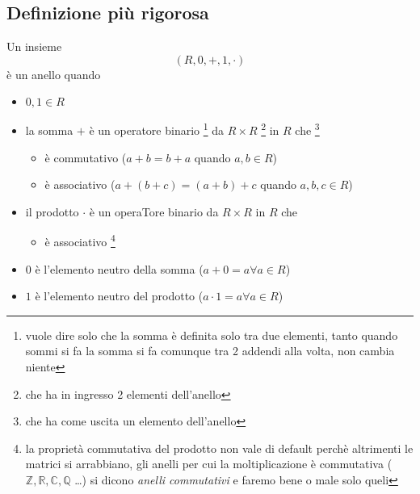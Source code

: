 \documentclass[11pt]{article}
\begin{document}
\subsection{Definizione più rigorosa}
\label{sec:org120c1fa}
Un insieme
\[(R,0,+,1,\cdot)\]
è un anello quando
\begin{itemize}
\item \(0,1 \in R\)
\item la somma \(+\) è un operatore binario
\footnote{vuole dire solo che la somma è definita solo tra due elementi,
tanto quando sommi si fa la somma si fa comunque tra 2 addendi alla
volta, non cambia niente} 
da \(R \times R\)
\footnote{che ha in ingresso 2 elementi dell'anello}
in \(R\) che
\footnote{che ha come uscita un elemento dell'anello}
\begin{itemize}
\item è commutativo (\(a+b = b+a\) quando \(a,b \in R\))
\item è associativo (\(a+(b+c) = (a+b)+c\) quando \(a,b,c \in R\))
\end{itemize}
\item il prodotto \(\cdot\) è un operaTore binario da \(R\times R\) in \(R\) che
\begin{itemize}
\item è associativo \footnote{la proprietà commutativa del prodotto non vale
di default perchè altrimenti le matrici si arrabbiano, gli anelli
per cui la moltiplicazione è commutativa
(\( \mathbb{Z}, \mathbb{R}, \mathbb{C}, \mathbb{Q} \) \ldots{})
si dicono \emph{anelli commutativi} e faremo bene o male solo queli}
\end{itemize}
\item \(0\) è l'elemento neutro della somma (\(a+0 = a \forall a \in R\))
\item \(1\) è l'elemento neutro del prodotto
(\(a \cdot 1 = a \forall a \in R\))
\end{itemize}
\end{document}
